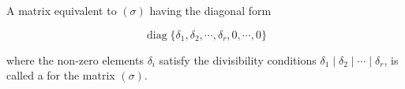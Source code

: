 A matrix equivalent to $(\sigma)$ having the diagonal form

$$\operatorname{diag}\{\delta_1, \delta_2, \cdots, \delta_r, 0, \cdots, 0\}$$

where the non-zero elements $\delta_i$ satisfy the divisibility conditions $\delta_1 \mid \delta_2 \mid \cdots \mid \delta_r$, is called a  for the matrix $(\sigma)$.
